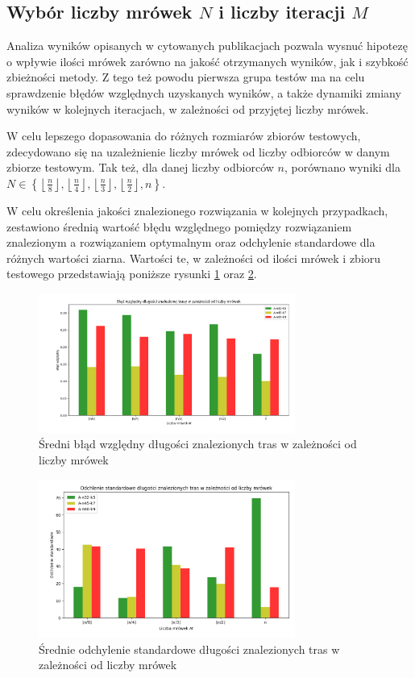 \documentclass[10pt]{article}
\begin{document}
\subsection{Wybór liczby mrówek $N$ i liczby iteracji $M$}
Analiza wyników opisanych w cytowanych publikacjach pozwala wysnuć hipotezę o wpływie ilości mrówek zarówno na jakość otrzymanych wyników, jak i szybkość zbieżności metody. Z tego też powodu pierwsza grupa testów ma na celu sprawdzenie błędów względnych uzyskanych wyników, a także dynamiki zmiany wyników w kolejnych iteracjach, w zależności od przyjętej liczby mrówek.

W celu lepszego dopasowania do różnych rozmiarów zbiorów testowych, zdecydowano się na uzależnienie liczby mrówek od liczby odbiorców w danym zbiorze testowym. Tak też, dla danej liczby odbiorców $n$, porównano wyniki dla $N \in \left\{ \left\lfloor\frac{n}{8}\right\rfloor, \left\lfloor\frac{n}{4}\right\rfloor, \left\lfloor\frac{n}{3}\right\rfloor, \left\lfloor\frac{n}{2}\right\rfloor, n \right\}$.

W celu określenia jakości znalezionego rozwiązania w kolejnych przypadkach, zestawiono średnią wartość błędu względnego pomiędzy rozwiązaniem znalezionym a rozwiązaniem optymalnym oraz odchylenie standardowe dla różnych wartości ziarna. Wartości te, w zależności od ilości mrówek i zbioru testowego przedstawiają poniższe rysunki \ref{fig:errors} oraz \ref{fig:deviation}. 

\begin{figure}[H]
    \centering
    \includegraphics[width=0.75\textwidth]{errors.png}
    \caption{Średni błąd względny długości znalezionych tras w zależności od liczby mrówek}
    \label{fig:errors}
\end{figure}

\begin{figure}[H]
    \centering
    \includegraphics[width=0.75\textwidth]{deviation.png}
    \caption{Średnie odchylenie standardowe długości znalezionych tras w zależności od liczby mrówek}
    \label{fig:deviation}
\end{figure}
\end{document}
